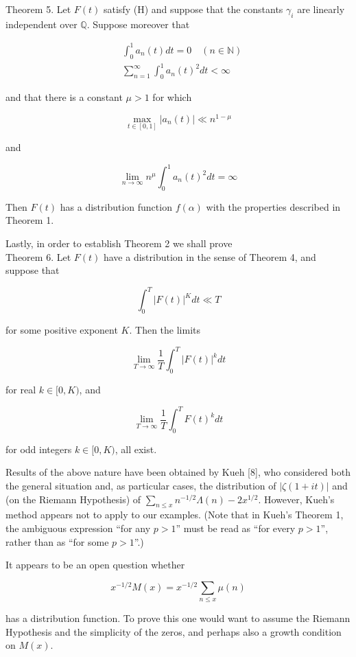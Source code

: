 \documentclass[10pt]{article}
\begin{document}
Theorem 5. Let $F(t)$ satisfy (H) and suppose that the constants $\gamma_{i}$ are linearly independent over $\mathbb{Q}$. Suppose moreover that

$$
\begin{aligned}
& \int_{0}^{1} a_{n}(t) d t=0 \quad(n \in \mathbb{N}) \\
& \sum_{n=1}^{\infty} \int_{0}^{1} a_{n}(t)^{2} d t<\infty
\end{aligned}
$$

and that there is a constant $\mu>1$ for which

$$
\max _{t \in[0,1]}\left|a_{n}(t)\right| \ll n^{1-\mu}
$$

and

$$
\lim _{n \rightarrow \infty} n^{\mu} \int_{0}^{1} a_{n}(t)^{2} d t=\infty
$$

Then $F(t)$ has a distribution function $f(\alpha)$ with the properties described in Theorem 1.

Lastly, in order to establish Theorem 2 we shall prove\\
Theorem 6. Let $F(t)$ have a distribution in the sense of Theorem 4, and suppose that

$$
\int_{0}^{T}|F(t)|^{K} d t \ll T
$$

for some positive exponent $K$. Then the limits

$$
\lim _{T \rightarrow \infty} \frac{1}{T} \int_{0}^{T}|F(t)|^{k} d t
$$

for real $k \in[0, K)$, and

$$
\lim _{T \rightarrow \infty} \frac{1}{T} \int_{0}^{T} F(t)^{k} d t
$$

for odd integers $k \in[0, K)$, all exist.

Results of the above nature have been obtained by Kueh [8], who considered both the general situation and, as particular cases, the distribution of $|\zeta(1+i t)|$ and (on the Riemann Hypothesis) of $\sum_{n \leq x} n^{-1 / 2} \Lambda(n)-2 x^{1 / 2}$. However, Kueh's method appears not to apply to our examples. (Note that in Kueh's Theorem 1, the ambiguous expression ``for any $p>1$'' must be read as ``for every $p>1$'', rather than as ``for some $p>1$''.)

It appears to be an open question whether

$$
x^{-1 / 2} M(x)=x^{-1 / 2} \sum_{n \leq x} \mu(n)
$$

has a distribution function. To prove this one would want to assume the Riemann Hypothesis and the simplicity of the zeros, and perhaps also a growth condition on $M(x)$.
\end{document}
